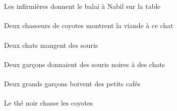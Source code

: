 \begin{exe}
\ex\gll
\DEFSgObl{}   \tableDSgObl{}   \SUR{}   \DEFPlErg{}   \infirmiereAPlErg{}    \INDSgDat{}   \NabilDSgDat{}   \DEFSgAbs{}   \balaiASgAbs{}  \donnerVdPrsASg{}\\
\DEFSgOblP{}   \tableDSgOblP{}   \SURP{}   \DEFPlErgP{}   \infirmiereAPlErgP{}    \INDSgDatP{}   \NabilDSgDatP{}   \DEFSgAbsP{}   \balaiASgAbsP{}  \donnerVdPrsASgP{}\\
Les infirmières donnent le balai à Nabil sur la table
\ex\gll
\INDDuErg{}    \INDPlObl{}   \coyoteCPlObl{}   \DE{}   \chasseurCDuErg{}    \DEMSgDat{}   \chatDSgDat{}   \DEFSgAbs{}   \viandeASgAbs{}  \montrerVdPrsASg{}\\
\INDDuErgP{}    \INDPlOblP{}   \coyoteCPlOblP{}   \DEP{}   \chasseurCDuErgP{}    \DEMSgDatP{}   \chatDSgDatP{}   \DEFSgAbsP{}   \viandeASgAbsP{}  \montrerVdPrsASgP{}\\
Deux chasseurs de coyotes montrent la viande à ce chat
\ex\gll
\INDDuErg{}   \chatDDuErg{}   \INDPlAbs{}   \sourisBPlAbs{}  \mangerVtPrsBPl{}\\
\INDDuErgP{}   \chatDDuErgP{}   \INDPlAbsP{}   \sourisBPlAbsP{}  \mangerVtPrsBPlP{}\\
Deux chats mangent des souris
\ex\gll
\INDDuErg{}   \garconDDuErg{}    \INDPlDat{}   \chatDPlDat{}   \INDPlAbs{}   \noirBPl{}   \sourisBPlAbs{}  \donnerVdPstBPl{}\\
\INDDuErgP{}   \garconDDuErgP{}    \INDPlDatP{}   \chatDPlDatP{}   \INDPlAbsP{}   \noirBPlP{}   \sourisBPlAbsP{}  \donnerVdPstBPlP{}\\
Deux garçons donnaient des souris noires à des chats
\ex\gll
\INDDuErg{}   \grandDDu{}   \garconDDuErg{}   \INDPlAbs{}   \petitCPl{}   \cafeCPlAbs{}  \boireVtPrsCPl{}\\
\INDDuErgP{}   \grandDDuP{}   \garconDDuErgP{}   \INDPlAbsP{}   \petitCPlP{}   \cafeCPlAbsP{}  \boireVtPrsCPlP{}\\
Deux grands garçons boivent des petits cafés
\ex\gll
\DEFSgErg{}   \noirBSg{}   \theBSgErg{}   \DEFPlAbs{}   \coyoteCPlAbs{}  \chasserVtPrsCPl{}\\
\DEFSgErgP{}   \noirBSgP{}   \theBSgErgP{}   \DEFPlAbsP{}   \coyoteCPlAbsP{}  \chasserVtPrsCPlP{}\\
Le thé noir chasse les coyotes
\ex\gll
\DEMPlErg{}   \troisCPl{}   \chasseurCPlErg{}    \DEFSgDat{}   \petitDSg{}   \blancDSg{}   \garconDSgDat{}   \INDDuAbs{}    \DEFPlObl{}   \plaineAPlObl{}   \DE{}   \autrucheBDuAbs{}  \offrirVdPstBDu{}\\
\DEMPlErgP{}   \troisCPlP{}   \chasseurCPlErgP{}    \DEFSgDatP{}   \petitDSgP{}   \blancDSgP{}   \garconDSgDatP{}   \INDDuAbsP{}    \DEFPlOblP{}   \plaineAPlOblP{}   \DEP{}   \autrucheBDuAbsP{}  \offrirVdPstBDuP{}\\

\end{exe}
